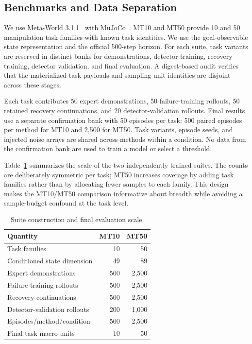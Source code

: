\documentclass[conference]{IEEEtran}
\begin{document}
\subsection{Benchmarks and Data Separation}
We use Meta-World 3.1.1~\cite{yu2020metaworld} with MuJoCo~\cite{todorov2012mujoco}. MT10 and MT50 provide 10 and 50 manipulation task families with known task identities. We use the goal-observable state representation and the official 500-step horizon. For each suite, task variants are reserved in distinct banks for demonstrations, detector training, recovery training, detector validation, and final evaluation. A digest-based audit verifies that the materialized task payloads and sampling-unit identities are disjoint across these stages.

Each task contributes 50 expert demonstrations, 50 failure-training rollouts, 50 retained recovery continuations, and 20 detector-validation rollouts. Final results use a separate confirmation bank with 50 episodes per task: 500 paired episodes per method for MT10 and 2,500 for MT50. Task variants, episode seeds, and injected noise arrays are shared across methods within a condition. No data from the confirmation bank are used to train a model or select a threshold.

Table~\ref{tab:scale} summarizes the scale of the two independently trained suites. The counts are deliberately symmetric per task; MT50 increases coverage by adding task families rather than by allocating fewer samples to each family. This design makes the MT10/MT50 comparison informative about breadth while avoiding a sample-budget confound at the task level.

\begin{table}[t]
\centering
\caption{Suite construction and final evaluation scale.}
\label{tab:scale}
\footnotesize
\setlength{\tabcolsep}{4.0pt}
\begin{tabular}{lrr}
\toprule
Quantity & MT10 & MT50 \\
\midrule
Task families & 10 & 50 \\
Conditioned state dimension & 49 & 89 \\
Expert demonstrations & 500 & 2,500 \\
Failure-training rollouts & 500 & 2,500 \\
Recovery continuations & 500 & 2,500 \\
Detector-validation rollouts & 200 & 1,000 \\
Episodes/method/condition & 500 & 2,500 \\
Final task-macro units & 10 & 50 \\
\bottomrule
\end{tabular}
\end{table}
\end{document}
